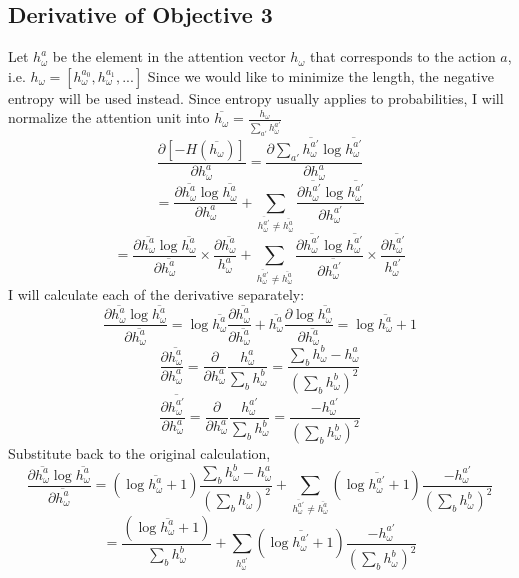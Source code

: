 \documentclass{article}
\begin{document}
	\subsection{Derivative of Objective 3}
	Let $h_\omega^a$ be the element in the attention vector $h_\omega$ that corresponds to the action $a$, i.e. $h_\omega = [h_\omega^{a_0}, h_\omega^{a_1}, ...]$
	Since we would like to minimize the length, the negative entropy will be used instead.
	Since entropy usually applies to probabilities, I will normalize the attention unit into $\overline{h_\omega} = \frac{h_\omega}{\sum_{a'} h_\omega^{a'}}$
	$$\frac{\partial [-H(\overline{h_\omega})]}{\partial h_\omega^a} = \frac{\partial \sum_{a'} \overline{h_\omega^{a'}}\log \overline{h_\omega^{a'}}}{\partial h_\omega^a}$$
	$$= \frac{\partial \overline{h_\omega^a} \log \overline{h_\omega^a}}{\partial h_\omega^a} + \sum_{\overline{h_\omega^{a'}} \neq \overline{h_\omega^{a}}} \frac{\partial \overline{h_\omega^{a'}} \log \overline{h_\omega^{a'}}}{\partial h_\omega^{a'}}$$
	$$= \frac{\partial \overline{h_\omega^a} \log \overline{h_\omega^a}}{\partial \overline{h_\omega^{a}}} \times \frac{\partial \overline{h_\omega^a}}{h_\omega^a} + \sum_{\overline{h_\omega^{a'}} \neq \overline{h_\omega^{a}}} \frac{\partial \overline{h_\omega^{a'}} \log \overline{h_\omega^{a'}}}{\partial \overline{h_\omega^{a'}}} \times \frac{\partial \overline{h_\omega^{a'}}}{h_\omega^{a'}}$$
	I will calculate each of the derivative separately:
	$$\frac{\partial \overline{h_\omega^a} \log \overline{h_\omega^a}}{\partial \overline{h_\omega^{a}}} = \log \overline{h_\omega^a}\frac{\partial \overline{h_\omega^a}}{\partial \overline{h_\omega^{a}}} + \overline{h_\omega^a}\frac{\partial \log \overline{h_\omega^a}}{\partial \overline{h_\omega^{a}}} = \log \overline{h_\omega^a} + 1$$
	$$\frac{\partial \overline{h_{\omega}^a}}{\partial h_\omega^a} = \frac{\partial}{\partial h_\omega^a} \frac{h_\omega^a}{\sum_b h_\omega^b} = \frac{\sum_b h_\omega^b - h_\omega^a}{(\sum_{b} h_\omega^b)^2}$$
	$$\frac{\partial \overline{h_{\omega}^{a'}}}{\partial h_\omega^a} = \frac{\partial}{\partial h_\omega^a} \frac{h_\omega^{a'}}{\sum_b h_\omega^b} = \frac{- h_\omega^{a'}}{(\sum_b h_\omega^b)^2}$$
	Substitute back to the original calculation,
	$$\frac{\partial \overline{h_\omega^a} \log \overline{h_\omega^a}}{\partial \overline{h_\omega^{a}}} = (\log \overline{h_\omega^a} + 1)\frac{\sum_b h_\omega^b - h_\omega^a}{(\sum_{b} h_\omega^b)^2} + \sum_{\overline{h_\omega^{a'}} \neq \overline{h_\omega^{a}}} (\log \overline{h_\omega^{a'}} + 1)\frac{- h_\omega^{a'}}{(\sum_b h_\omega^b)^2}$$
	$$=\frac{(\log \overline{h_\omega^a} + 1)}{\sum_b h_\omega^b} + \sum_{h_\omega^{a'}} (\log \overline{h_\omega^{a'}} + 1)\frac{- h_\omega^{a'}}{(\sum_b h_\omega^b)^2}$$
\end{document}
